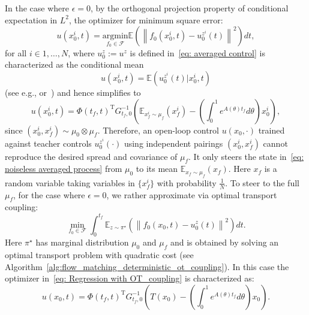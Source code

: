 \documentclass[12pt]{amsart}
\renewcommand{\(}{\left (}
\renewcommand{\)}{\right )}
\numberwithin{equation}{section}
\begin{document}
In the case where $\epsilon=0$, by the orthogonal projection property of conditional expectation in $L^2$, the optimizer for minimum square error:
\[
u\left(x^i_0,t\right)=\underset{f_{0}\in \mathcal{F}}{\mathrm{argmin}}\mathbb{E}\left(\left\|f_{0}\left(x^i_0,t\right)-u_{0}^{z^i}(t)\right\|^2\right)dt,
\]
for all $i\in 1,\dots,N$, where $u_{0}^{z}:=u^z$ is defined in~\eqref{eq: averaged control} is characterized as the conditional mean
\[
u\left(x^i_0,t\right)= \mathbb{E}(u_{0}^{z^i}(t)|x_0^i,t)
\]
(see e.g.,\cite[pp~85]{DW:91} or~\cite[pp~475]{PB:95}) and hence simplifies to
\begin{equation*}
u\left(x^i_0,t\right)= \Phi(t_f,t)^{\mathrm{T}} G_{t_f,0}^{-1}\left(\mathbb{E}_{x^i_f\sim\mu_f}(x^i_f)-\left(\int_{0}^{1}e^{A(\theta)t_f}d\theta\right) x_0^i\right),   
\end{equation*}
since $(x^i_0,x^i_f)\sim\mu_0\otimes\mu_f$. Therefore, an open-loop control $u(x_0,\cdot)$ trained against teacher controls $u_{0}^{z^i}(\cdot)$ using independent pairings $(x^i_0,x^i_f)$ cannot reproduce the desired spread and covariance of $\mu_f$. It only steers the state in~\eqref{eq: noiseless averaged process} from $\mu_0$ to its mean $\mathbb{E}_{x_f\sim\mu_f}(x_f)$. Here $x_f$ is a random variable taking variables in $\{x^i_f\}$ with probability $\frac{1}{N}$. %
To steer to the full $\mu_f$, for the case where $\epsilon=0$, we rather approximate via optimal transport coupling:
\begin{equation}\label{eq: Regression with OT_coupling}
\min_{f_{0}\in \mathcal{F}}\int_0^{t_f}\mathbb{E}_{z\sim\pi^{\star}}\left(\left\|f_{0}\left(x_0,t\right)-u_{0}^{z}(t)\right\|^2\right)dt.    
\end{equation}
Here $\pi^{\star}$ has marginal distribution $\mu_0$ and $\mu_f$ and is obtained by solving an optimal transport problem with quadratic cost (see Algorithm~\ref{alg:flow_matching_deterministic_ot_coupling}). In this case the optimizer in~\eqref{eq: Regression with OT_coupling} is characterized as:
\begin{equation}\label{eq: control_via_OT_coupling}
u(x_0,t)= \Phi(t_f,t)^{\mathrm{T}} G_{t_f,0}^{-1}\left(T(x_0)-\left(\int_{0}^{1}e^{A(\theta)t_f}d\theta\right) x_0\right).    
\end{equation}
\end{document}
